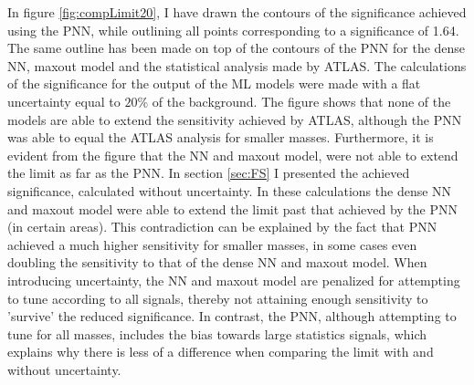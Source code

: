 In figure \ref{fig:compLimit20}, I have drawn the contours of the significance achieved using the \ac{PNN},
while outlining all points corresponding to a significance of 1.64. The same outline has been made on top of the 
contours of the \ac{PNN} for the dense \ac{NN}, maxout model and the statistical analysis made by \ac{ATLAS}. The calculations
of the significance for the output of the \ac{ML} models were made with a flat uncertainty equal to $20\%$ of the background.
The figure shows that none of the models are able to extend the sensitivity achieved by \ac{ATLAS}, although the \ac{PNN} was able to equal
the \ac{ATLAS} analysis for smaller masses. Furthermore, it is evident from the figure that the \ac{NN} and maxout model, were not able to 
extend the limit as far as the \ac{PNN}. In section \ref{sec:FS} I presented the achieved significance, calculated without uncertainty. In these
calculations the dense \ac{NN} and maxout model were able to extend the limit past that achieved by the \ac{PNN} (in certain areas). 
This contradiction can be explained by the fact that \ac{PNN} achieved a much higher sensitivity for smaller masses, in some cases even 
doubling the sensitivity to that of the dense \ac{NN} and maxout model. When introducing uncertainty, the \ac{NN} and maxout model are 
penalized for attempting to tune according to all signals, thereby not attaining enough sensitivity to 'survive' the reduced significance. 
In contrast, the \ac{PNN}, although attempting to tune for all masses, includes the bias towards large statistics signals, which explains why there 
is less of a difference when comparing the limit with and without uncertainty.\\
